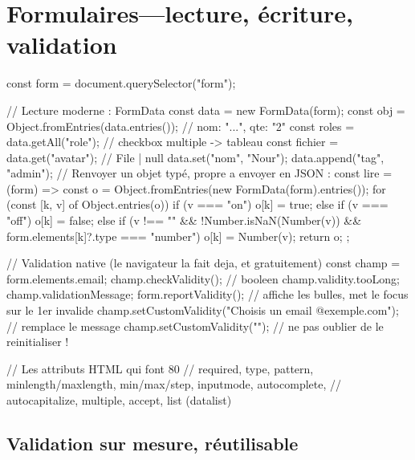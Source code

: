 \documentclass[12pt,a4paper,twoside,openright]{book}
\begin{document}
\section{Formulaires---lecture, \'ecriture, validation}

\begin{codejs}
const form = document.querySelector("form");

// Lecture moderne : FormData
const data = new FormData(form);
const obj = Object.fromEntries(data.entries());           // { nom: "...", qte: "2" }
const roles = data.getAll("role");                         // checkbox multiple -> tableau
const fichier = data.get("avatar");                        // File | null
data.set("nom", "Nour"); data.append("tag", "admin");
// Renvoyer un objet typ\'e, propre a envoyer en JSON :
const lire = (form) => {
  const o = Object.fromEntries(new FormData(form).entries());
  for (const [k, v] of Object.entries(o)) {
    if (v === "on") o[k] = true;
    else if (v === "off") o[k] = false;
    else if (v !== "" && !Number.isNaN(Number(v)) && form.elements[k]?.type === "number") o[k] = Number(v);
  }
  return o;
};

// Validation native (le navigateur la fait deja, et gratuitement)
const champ = form.elements.email;
champ.checkValidity();          // booleen
champ.validity.tooLong; champ.validationMessage;
form.reportValidity();          // affiche les bulles, met le focus sur le 1er invalide
champ.setCustomValidity("Choisis un email @exemple.com");   // remplace le message
champ.setCustomValidity("");     // ne pas oublier de le reinitialiser !

// Les attributs HTML qui font 80 %
// required, type, pattern, minlength/maxlength, min/max/step, inputmode, autocomplete,
// autocapitalize, multiple, accept, list (datalist)
\end{codejs}

\subsection{Validation sur mesure, r\'eutilisable}
\end{document}
